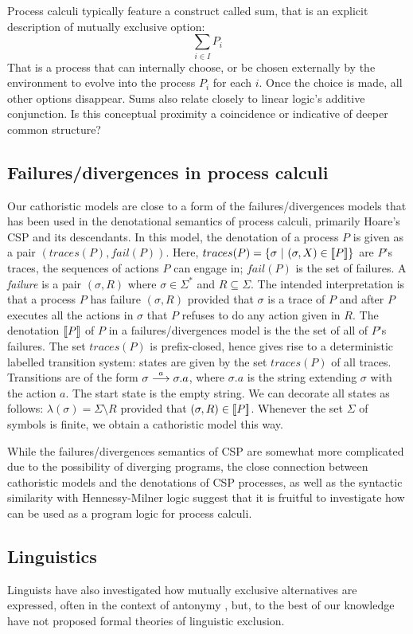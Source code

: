 Process calculi typically feature a construct called sum, that is an
explicit description of mutually exclusive option:
\[
     \sum_{i \in I} P_i
\]
That is a process that can internally choose, or be chosen externally
by the environment to evolve into the process $P_i$ for each $i$. Once
the choice is made, all other options disappear.  Sums also relate
closely to linear logic's additive conjunction. Is this conceptual
proximity a coincidence or indicative of deeper common structure?


\subsection{Failures/divergences in process calculi}

Our cathoristic models are close to a form of the failures/divergences
models that has been used in the denotational semantics of process
calculi, primarily Hoare's CSP \cite{HoareC:comseq,RoscoeAW:theapoc}
and its descendants.  In this model, the denotation of a process $P$
is given as a pair $(traces(P), fail(P))$.
Here, $traces(P) = \{
\sigma\ |\ (\sigma, X) \in \lbrack\!\lbrack P \rbrack\!\rbrack \}$ are $P$'s traces, the sequences of actions $P$ can engage in;
 $fail(P)$ is the set of failures.  
A \emph{failure} is a pair $(\sigma, R)$ where $\sigma \in
\Sigma^*$ and $R \subseteq \Sigma$. The intended interpretation is
that a process $P$ has failure $(\sigma, R)$ provided that $\sigma$ is
a trace of $P$ and after $P$ executes all the actions in $\sigma$ that  $P$
refuses to do any action given in $R$. The denotation $\lbrack\!\lbrack P \rbrack\!\rbrack$ of
$P$ in a failures/divergences model is the the set of all of $P$'s
failures. The set $ traces(P)$ is prefix-closed, hence gives rise to a
deterministic labelled transition system: states are given by the set
$traces(P)$ of all traces.  Transitions are of the form $\sigma
\stackrel{a}{\longrightarrow} \sigma.a$, where $\sigma.a$ is the string extending $\sigma$
with the action $a$.  The start state is the empty string.  We can
decorate all states as follows: $ \lambda (\sigma) = \Sigma \setminus
R $ provided that $(\sigma, R) \in \lbrack\!\lbrack P \rbrack\!\rbrack$.  Whenever the set
$\Sigma$ of symbols is finite, we obtain a cathoristic model this
way.

While the failures/divergences semantics of CSP are somewhat more
complicated due to the possibility of diverging programs, the close
connection between cathoristic models and the denotations of CSP processes,
as well as the syntactic similarity with Hennessy-Milner logic suggest
that it is fruitful to investigate how \cathoristic{} can be used
as a program logic for process calculi.

\subsection{Linguistics}

Linguists have also investigated how mutually exclusive alternatives
are expressed, often in the context of antonymy
\cite{OKeeffeA:rouhanocl,AronoffM:hanlin,AllanK:conencos}, but, to the
best of our knowledge have not proposed formal theories of linguistic
exclusion.

